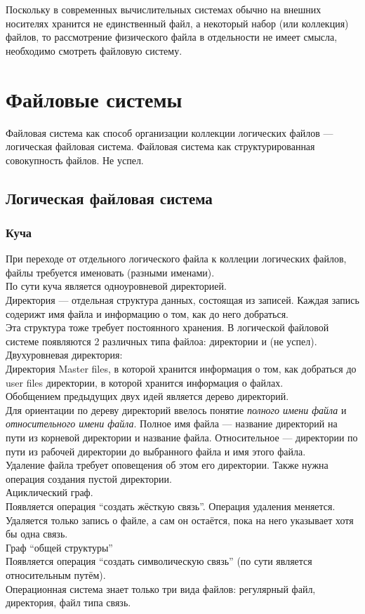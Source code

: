 \documentclass[12pt, a4paper]{article}
\begin{document}
    Поскольку в современных вычислительных системах обычно на внешних носителях хранится не единственный файл, а некоторый набор (или коллекция) файлов, то рассмотрение физического файла в отдельности не имеет смысла, необходимо смотреть файловую систему.
    \section{Файловые системы}
    Файловая система как способ организации коллекции логических файлов --- логическая файловая система.
    Файловая система как структурированная совокупность файлов. Не успел.
    \subsection[short]{Логическая файловая система}
    \subsubsection{Куча}
    При переходе от отдельного логического файла к коллеции логических файлов, файлы требуется именовать (разными именами).\\
    По сути куча является одноуровневой директорией.\\
    Директория --- отдельная структура данных, состоящая из записей. Каждая запись содерижт имя файла и информацию о том, как до него добраться.\\
    Эта структура тоже требует постоянного хранения. В логической файловой системе появляются 2 различных типа файлоа: директории и (не успел).
    Двухуровневая директория:\\
    Директория Master files, в которой хранится информация о том, как добраться до user files директории, в которой хранится информация о файлах.\\
    Обобщением предыдущих двух идей является дерево директорий.\\
    Для ориентации по дереву директорий ввелось понятие \textit{полного имени файла} и \textit{относительного имени файла}. Полное имя файла --- название директорий на пути из корневой директории и название файла. Относительное --- директории  по пути из рабочей директории до выбранного файла и имя этого файла.\\
    Удаление файла требует оповещения об этом его директории. Также нужна операция создания пустой директории.\\
    Ациклический граф.\\
    Появляется операция ``создать жёсткую связь''. Операция удаления меняется. Удаляется только запись о файле, а сам он остаётся, пока на него указывает хотя бы одна связь.\\
    Граф ``общей структуры''\\
    Появляется операция ``создать символическую связь'' (по сути является относительным путём).\\
    Операционная система знает только три вида файлов: регулярный файл, директория, файл типа связь.
\end{document}
